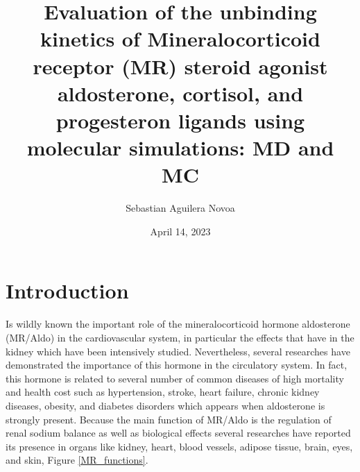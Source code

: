 \documentclass[letter,10pt, twocolumn]{article}
\title{Evaluation of the unbinding kinetics of Mineralocorticoid receptor (MR) steroid agonist aldosterone, cortisol, and progesteron ligands using molecular simulations: MD and MC}
\author{Sebastian Aguilera Novoa}
\date{April 14, 2023}
\begin{document}


\section{Introduction}

Is wildly known the important role of the mineralocorticoid hormone aldosterone (MR/Aldo) in the cardiovascular system, in particular the effects that have in the kidney which have been intensively studied. Nevertheless, several researches have demonstrated the importance of this hormone in the circulatory system. In fact, this hormone is related to several number of common diseases of high mortality and health cost such as hypertension, stroke, heart failure, chronic kidney diseases, obesity, and diabetes disorders which appears when aldosterone is strongly present. Because the main function of MR/Aldo is the regulation of renal sodium balance as well as biological effects several researches have reported its presence in organs like kidney, heart, blood vessels, adipose tissue, brain, eyes, and skin, Figure \ref{MR_functions}. \cite{book-MR_AS4, MR-as4_importance} 
\end{document}
